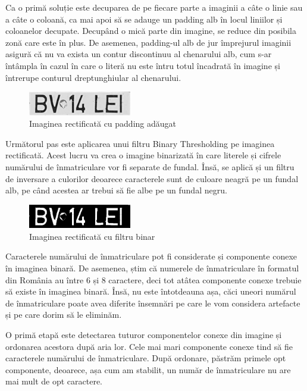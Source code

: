 \documentclass[a4paper,12pt]{report}
\begin{document}
Ca o primă soluție este decuparea de pe fiecare parte a imaginii a câte o linie sau a câte o coloană, ca mai apoi să se adauge un padding alb în locul liniilor și coloanelor decupate. Decupând o mică parte din imagine, se reduce din posibila zonă care este în plus. De asemenea, padding-ul alb de jur împrejurul imaginii asigură că nu va exista un contur discontinuu al chenarului alb, cum s-ar întâmpla în cazul în care o literă nu este întru totul încadrată în imagine și întrerupe conturul dreptunghiular al chenarului.

\begin{figure}[h!]
    \centering
    \includegraphics[width=0.4\textwidth]{images/boardered.jpg}
    \caption{Imaginea rectificată cu padding adăugat}
\end{figure}
\FloatBarrier

Următorul pas este aplicarea unui filtru Binary Thresholding pe imaginea rectificată. Acest lucru va crea o imagine binarizată în care literele și cifrele numărului de înmatriculare vor fi separate de fundal. Însă, se aplică și un filtru de inversare a culorilor deoarece caracterele sunt de culoare neagră pe un fundal alb, pe când acestea ar trebui să fie albe pe un fundal negru.

\begin{figure}[h!]
    \centering
    \includegraphics[width=0.4\textwidth]{images/text.jpg}
    \caption{Imaginea rectificată cu filtru binar}
\end{figure}
\FloatBarrier

Caracterele numărului de înmatriculare pot fi considerate și componente conexe în imaginea binară. De asemenea, știm că numerele de înmatriculare în formatul din România au între 6 și 8 caractere, deci tot atâtea componente conexe trebuie să existe în imaginea binară. Însă, nu este întotdeauna așa, căci uneori numărul de înmatriculare poate avea diferite însemnări pe care le vom considera artefacte și pe care dorim să le eliminăm.

O primă etapă este detectarea tuturor componentelor conexe din imagine și ordonarea acestora după aria lor. Cele mai mari componente conexe tind să fie caracterele numărului de înmatriculare. După ordonare, păstrăm primele opt componente, deoarece, așa cum am stabilit, un număr de înmatriculare nu are mai mult de opt caractere.
\end{document}
